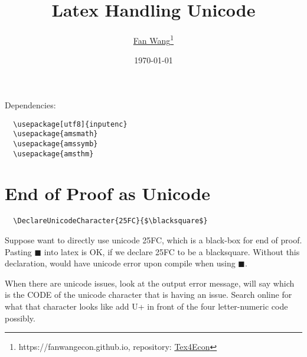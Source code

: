 \documentclass[12pt,english]{article}
\title{Latex Handling Unicode}
\author{\href{https://fanwangecon.github.io/}{Fan Wang}\thanks{https://fanwangecon.github.io, repository: \href{https://fanwangecon.github.io/Tex4Econ/}{Tex4Econ}}}
\date{\today}
\begin{document}
\maketitle

Dependencies:
\begin{verbatim}
  \usepackage[utf8]{inputenc}
  \usepackage{amsmath}
  \usepackage{amssymb}
  \usepackage{amsthm}
\end{verbatim}

\section{End of Proof as Unicode}

\begin{verbatim}
  \DeclareUnicodeCharacter{25FC}{$\blacksquare$}
\end{verbatim}

Suppose want to directly use unicode 25FC, which is a black-box for end of proof. Pasting ◼ into latex is OK, if we declare 25FC to be a blacksquare. Without this declaration, would have unicode error upon compile when using ◼. 

When there are unicode issues, look at the output error message, will say which is the CODE of the unicode character that is having an issue. Search online for what that character looks like add U+ in front of the four letter-numeric code possibly.
\end{document}
